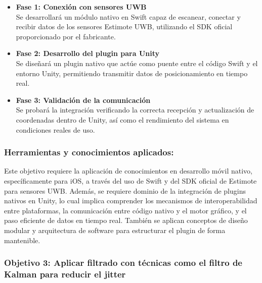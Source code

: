 \begin{itemize}
    \item \textbf{Fase 1: Conexión con sensores UWB} \\
    Se desarrollará un módulo nativo en Swift capaz de escanear, conectar y recibir datos de los sensores Estimote UWB, utilizando el SDK oficial proporcionado por el fabricante.

    \item \textbf{Fase 2: Desarrollo del plugin para Unity} \\
    Se diseñará un plugin nativo que actúe como puente entre el código Swift y el entorno Unity, permitiendo transmitir datos de posicionamiento en tiempo real.

    \item \textbf{Fase 3: Validación de la comunicación} \\
    Se probará la integración verificando la correcta recepción y actualización de coordenadas dentro de Unity, así como el rendimiento del sistema en condiciones reales de uso.
\end{itemize}

\subsubsection{Herramientas y conocimientos aplicados:} 
{\justify Este objetivo requiere la aplicación de conocimientos en desarrollo móvil nativo, específicamente para iOS, a través del uso de Swift y del SDK oficial de Estimote para sensores UWB. Además, se requiere dominio de la integración de plugins nativos en Unity, lo cual implica comprender los mecanismos de interoperabilidad entre plataformas, la comunicación entre código nativo y el motor gráfico, y el paso eficiente de datos en tiempo real. También se aplican conceptos de diseño modular y arquitectura de software para estructurar el plugin de forma mantenible.}

\subsubsection{Objetivo 3: Aplicar filtrado con técnicas como el filtro de Kalman para reducir el jitter}

